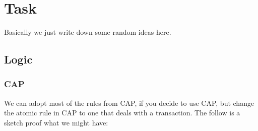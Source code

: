 \section{Task}

Basically we just write down some random ideas here.

\subsection{Logic}

\subsubsection{CAP}
We can adopt most of the rules from CAP, if you decide to use CAP, but change the atomic rule in CAP to one that deals with a transaction.
The follow is a sketch proof what we might have:
